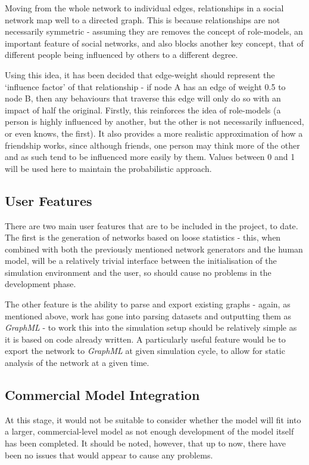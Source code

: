 \documentclass[]{article}
\begin{document}
Moving from the whole network to individual edges, relationships in a social network map well to a directed graph. This is because relationships are not necessarily symmetric - assuming they are removes the concept of role-models, an important feature of social networks, and also blocks another key concept,  that of different people being influenced by others to a different degree. 

Using this idea, it has been decided that edge-weight should represent the `influence factor' of that relationship - if node A has an edge of weight 0.5 to node B, then any behaviours that traverse this edge will only do so with an impact of half the original. Firstly, this reinforces the idea of role-models (a person is highly influenced by another, but the other is not necessarily influenced, or even knows, the first). It also provides a more realistic approximation of how a friendship works, since although friends, one person may think more of the other and as such tend to be influenced more easily by them. Values between 0 and 1 will be used here to maintain the probabilistic approach.

\subsection{User Features}

There are two main user features that are to be included in the project, to date. The first is the generation of networks based on loose statistics - this, when combined with both the previously mentioned network generators and the human model, will be a relatively trivial interface between the initialisation of the simulation environment and the user, so should cause no problems in the development phase. 

The other feature is the ability to parse and export existing graphs - again, as mentioned above, work has gone into parsing datasets and outputting them as \emph{GraphML} - to work this into the simulation setup should be relatively simple as it is based on code already written. A particularly useful feature would be to export the network to \emph{GraphML} at given simulation cycle, to allow for static analysis of the network at a given time. 

\subsection{Commercial Model Integration}

At this stage, it would not be suitable to consider whether the model will fit into a larger, commercial-level model as not enough development of the model itself has been completed. It should be noted, however, that up to now, there have been no issues that would appear to cause any problems. 
\end{document}
